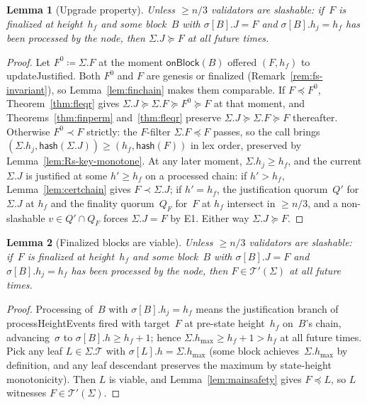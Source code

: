 \documentclass{article}
\newcommand{\T}[0]{\ensuremath{\mathcal{T}}}
\newcommand{\hash}{\mathsf{hash}}
\newcommand{\hmax}{\ensuremath{h_{\max}}\xspace}
\newcommand{\viableTree}{\ensuremath{\mathcal{T}'}}
\newcommand{\processHeightEvents}{\textsf{processHeightEvents}\xspace}
\newcommand{\onBlock}{\textsf{onBlock}\xspace}
\newcommand{\updateJustified}{\textsf{updateJustified}\xspace}
\theoremstyle{plain}
\newtheorem{lemma}{Lemma}
\theoremstyle{definition}
\theoremstyle{remark}
\begin{document}
\begin{lemma}[Upgrade property]\label{lem:upgrade}
Unless $\geq n/3$ validators are slashable: if~$F$ is finalized at height~$h_f$ and some block~$B$ with $\sigma[B].J = F$ and $\sigma[B].h_j = h_f$ has been processed by the node, then $\Sigma.J \succeq F$ at all future times.
\end{lemma}

\begin{proof}
Let $F^0 \coloneqq \Sigma.F$ at the moment $\onBlock(B)$ offered $(F, h_f)$ to \updateJustified.
Both $F^0$ and $F$ are genesis or finalized (Remark~\ref{rem:fs-invariant}), so Lemma~\ref{lem:finchain} makes them comparable.
If $F \preceq F^0$, Theorem~\ref{thm:fleqr} gives $\Sigma.J \succeq \Sigma.F \succeq F^0 \succeq F$ at that moment, and Theorems~\ref{thm:finperm} and~\ref{thm:fleqr} preserve $\Sigma.J \succeq \Sigma.F \succeq F$ thereafter.
Otherwise $F^0 \prec F$ strictly: the $F$-filter $\Sigma.F \preceq F$ passes, so the call brings $(\Sigma.h_j, \hash(\Sigma.J)) \geq (h_f, \hash(F))$ in lex order, preserved by Lemma~\ref{lem:Rs-key-monotone}.
At any later moment, $\Sigma.h_j \geq h_f$, and the current $\Sigma.J$ is justified at some $h' \geq h_f$ on a processed chain: if $h' > h_f$, Lemma~\ref{lem:certchain} gives $F \prec \Sigma.J$; if $h' = h_f$, the justification quorum~$Q'$ for $\Sigma.J$ at $h_f$ and the finality quorum~$Q_F$ for~$F$ at $h_f$ intersect in $\geq n/3$, and a non-slashable $v \in Q' \cap Q_F$ forces $\Sigma.J = F$ by E1.
Either way $\Sigma.J \succeq F$.
\end{proof}

\begin{lemma}[Finalized blocks are viable]\label{lem:viable-finalized}
Unless $\geq n/3$ validators are slashable: if~$F$ is finalized at height~$h_f$ and some block~$B$ with $\sigma[B].J = F$ and $\sigma[B].h_j = h_f$ has been processed by the node, then $F \in \viableTree(\Sigma)$ at all future times.
\end{lemma}

\begin{proof}
Processing of~$B$ with $\sigma[B].h_j = h_f$ means the justification branch of \processHeightEvents fired with target~$F$ at pre-state height~$h_f$ on~$B$'s chain, advancing~$\sigma$ to $\sigma[B].h \geq h_f + 1$; hence $\Sigma.\hmax \geq h_f + 1 > h_f$ at all future times.
Pick any leaf $L \in \Sigma.\T$ with $\sigma[L].h = \Sigma.\hmax$ (some block achieves~$\Sigma.\hmax$ by definition, and any leaf descendant preserves the maximum by state-height monotonicity).
Then $L$ is viable, and Lemma~\ref{lem:mainsafety} gives $F \preceq L$, so $L$ witnesses $F \in \viableTree(\Sigma)$.
\end{proof}
\end{document}
